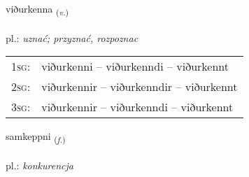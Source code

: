 \documentclass[frontgrid, backgrid]{flacards}\usepackage[]{graphicx}\usepackage[]{xcolor}
\begin{document}
\renewcommand{\flhead}{\vskip5pt \fboxsep=0pt {\small\bfseries\footnotesize Sagnorð | Verb}}
\renewcommand{\fcfoot}{\vskip5pt \fboxsep=0pt \hspace{2pt}{\small\bfseries\footnotesize 1K}}

\renewcommand{\blhead}{\vskip5pt {\small\bfseries\footnotesize Sagnorð | Verb }}
\renewcommand{\bcfoot}{\vskip5pt \hspace{2pt}{\small\bfseries\footnotesize 1K}}


{viðurkenna \small{\textsubscript{(\textit{v.})}} \\[1ex] %
 \\
pl.: \emph{uznać; przyznać, rozpoznac} \\  [2ex]
\renewcommand*{\arraystretch}{0.8}
\begin{tabular}{p{1cm}l}
\textsc{1sg}: & viðurkenni -- viðurkenndi -- viðurkennt \\ 
\textsc{2sg}: & viðurkennir -- viðurkenndir -- viðurkennt \\ 
\textsc{3sg}: & viðurkennir -- viðurkenndi -- viðurkennt \\ 
\end{tabular}
}

\renewcommand{\flhead}{\vskip5pt \fboxsep=0pt {\small\bfseries\footnotesize Nafnorð | Noun}}
\renewcommand{\fcfoot}{\vskip5pt \fboxsep=0pt \hspace{2pt}{\small\bfseries\footnotesize 1K}}

\renewcommand{\blhead}{\vskip5pt {\small\bfseries\footnotesize Nafnorð | Noun }}
\renewcommand{\bcfoot}{\vskip5pt \hspace{2pt}{\small\bfseries\footnotesize 1K}}


{samkeppni \small{\textsubscript{(\textit{f.})}} \\[1ex] %
\textphonetic{[samcʰɛhpnɪ]} \\
pl.: \emph{konkurencja} \\  [2ex]
\renewcommand*{\arraystretch}{0.8}
}
\end{document}
